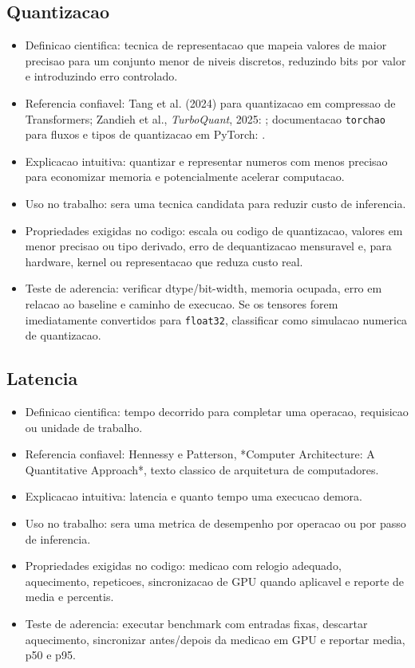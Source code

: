 \subsection{Quantizacao}


\begin{itemize}
\item Definicao cientifica: tecnica de representacao que mapeia valores de maior
precisao para um conjunto menor de niveis discretos, reduzindo bits por valor
e introduzindo erro controlado.
\item Referencia confiavel: Tang et al. (2024) para quantizacao em compressao de
Transformers; Zandieh et al., \emph{TurboQuant}, 2025:
; documentacao \texttt{torchao} para fluxos e
tipos de quantizacao em PyTorch:
.
\item Explicacao intuitiva: quantizar e representar numeros com menos precisao para
economizar memoria e potencialmente acelerar computacao.
\item Uso no trabalho: sera uma tecnica candidata para reduzir custo de inferencia.
\item Propriedades exigidas no codigo: escala ou codigo de quantizacao, valores em
menor precisao ou tipo derivado, erro de dequantizacao mensuravel e, para
hardware, kernel ou representacao que reduza custo real.
\item Teste de aderencia: verificar dtype/bit-width, memoria ocupada, erro em
relacao ao baseline e caminho de execucao. Se os tensores forem
imediatamente convertidos para \texttt{float32}, classificar como simulacao numerica
de quantizacao.
\end{itemize}


\subsection{Latencia}


\begin{itemize}
\item Definicao cientifica: tempo decorrido para completar uma operacao, requisicao
ou unidade de trabalho.
\item Referencia confiavel: Hennessy e Patterson, *Computer Architecture: A
Quantitative Approach*, texto classico de arquitetura de computadores.
\item Explicacao intuitiva: latencia e quanto tempo uma execucao demora.
\item Uso no trabalho: sera uma metrica de desempenho por operacao ou por passo de
inferencia.
\item Propriedades exigidas no codigo: medicao com relogio adequado, aquecimento,
repeticoes, sincronizacao de GPU quando aplicavel e reporte de media e
percentis.
\item Teste de aderencia: executar benchmark com entradas fixas, descartar
aquecimento, sincronizar antes/depois da medicao em GPU e reportar media, p50
e p95.
\end{itemize}


